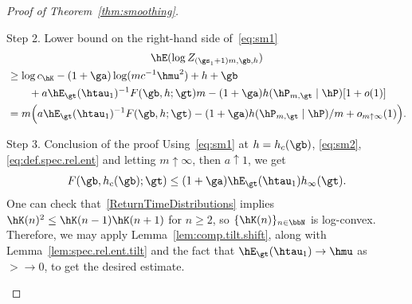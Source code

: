 \begin{proof}[Proof of Theorem~\ref{thm:smoothing}]
\begin{step}{Step 2. Lower bound on the right-hand side of~\eqref{eq:sm1}}
\begin{multline}\label{eq:sm2}
\hE (\log Z_{(\gs_1 + 1) m,\gb,h})\\
\begin{aligned}
&\geq \log c_{\hK} - (1 + \ga) \log(m c^{-1} \hmu^2) + h + \gb \\
&\qquad + a \hE_\gt(\htau_1)^{-1} F(\gb,h;\gt) m - (1 + \ga) h(\hP_{m,\gt} \mid \hP) [1 + o(1)]\\
&= m \Big(a \hE_\gt(\htau_1)^{-1} F(\gb,h;\gt) - (1 + \ga) h(\hP_{m,\gt} \mid \hP)/m + o_{m\uparrow\infty}(1) \Big).
\end{aligned}
\end{multline}
\end{step}

\begin{step}{Step 3. Conclusion of the proof}
Using~\eqref{eq:sm1} at $h = h_c(\gb)$, \eqref{eq:sm2}, \eqref{eq:def.spec.rel.ent} and letting $m \uparrow \infty$, then $a \uparrow 1$, we get
\begin{equation}
F(\gb,h_c(\gb);\gt) \leq (1 + \ga) \hE_\gt(\htau_1) h_\infty(\gt).
\end{equation}
One can check that~\eqref{ReturnTimeDistributions} implies $\hK(n)^2 \leq \hK(n-1) \hK(n+1)$ for $n \geq 2$, so $\{\hK(n)\}_{n\in\bbN}$ is log-convex. Therefore, we may apply Lemma~\ref{lem:comp.tilt.shift}, along with Lemma~\ref{lem:spec.rel.ent.tilt} and the fact that $\hE_\gt(\htau_1) \rightarrow \hmu$ as $\gt \to 0$, to get the desired estimate.
\end{step}


\end{proof}

